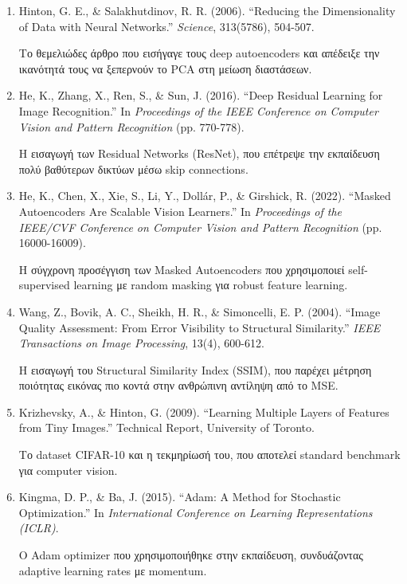 \documentclass[11pt,a4paper]{article}
\begin{document}
\begin{enumerate}
    \item \textenglish{Hinton, G. E., \& Salakhutdinov, R. R. (2006). ``Reducing the Dimensionality of Data with Neural Networks.'' \textit{Science}, 313(5786), 504-507.}
    
    Το θεμελιώδες άρθρο που εισήγαγε τους deep autoencoders και απέδειξε την ικανότητά τους να ξεπερνούν το PCA στη μείωση διαστάσεων.
    
    \item \textenglish{He, K., Zhang, X., Ren, S., \& Sun, J. (2016). ``Deep Residual Learning for Image Recognition.'' In \textit{Proceedings of the IEEE Conference on Computer Vision and Pattern Recognition} (pp. 770-778).}
    
    Η εισαγωγή των Residual Networks (ResNet), που επέτρεψε την εκπαίδευση πολύ βαθύτερων δικτύων μέσω skip connections.
    
    \item \textenglish{He, K., Chen, X., Xie, S., Li, Y., Dollár, P., \& Girshick, R. (2022). ``Masked Autoencoders Are Scalable Vision Learners.'' In \textit{Proceedings of the IEEE/CVF Conference on Computer Vision and Pattern Recognition} (pp. 16000-16009).}
    
    Η σύγχρονη προσέγγιση των Masked Autoencoders που χρησιμοποιεί self-supervised learning με random masking για robust feature learning.
    
    \item \textenglish{Wang, Z., Bovik, A. C., Sheikh, H. R., \& Simoncelli, E. P. (2004). ``Image Quality Assessment: From Error Visibility to Structural Similarity.'' \textit{IEEE Transactions on Image Processing}, 13(4), 600-612.}
    
    Η εισαγωγή του Structural Similarity Index (SSIM), που παρέχει μέτρηση ποιότητας εικόνας πιο κοντά στην ανθρώπινη αντίληψη από το MSE.
    
    \item \textenglish{Krizhevsky, A., \& Hinton, G. (2009). ``Learning Multiple Layers of Features from Tiny Images.'' Technical Report, University of Toronto.}
    
    Το dataset CIFAR-10 και η τεκμηρίωσή του, που αποτελεί standard benchmark για computer vision.
    
    \item \textenglish{Kingma, D. P., \& Ba, J. (2015). ``Adam: A Method for Stochastic Optimization.'' In \textit{International Conference on Learning Representations (ICLR)}.}
    
    Ο Adam optimizer που χρησιμοποιήθηκε στην εκπαίδευση, συνδυάζοντας adaptive learning rates με momentum.
\end{enumerate}
\end{document}
